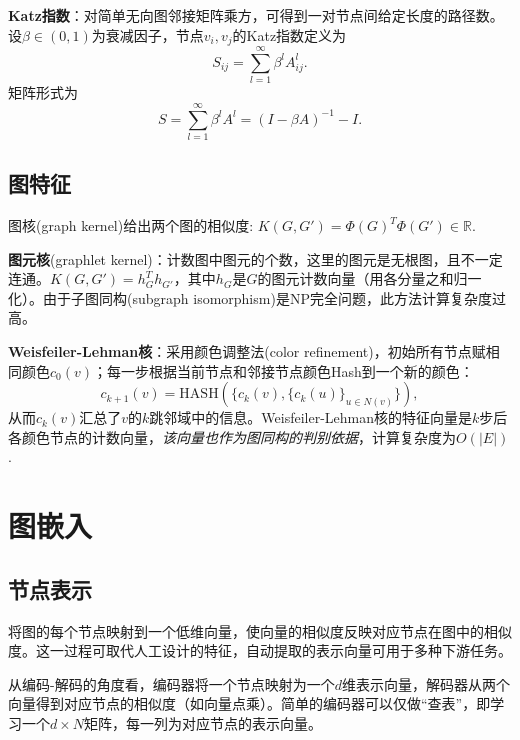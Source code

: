 \par \textbf{Katz指数}：对简单无向图邻接矩阵乘方，可得到一对节点间给定长度的路径数。设$\beta \in (0,1)$为衰减因子，节点$v_i,v_j$的Katz指数定义为
\begin{equation}
    S_{ij}=\sum_{l=1}^\infty \beta^l A^l_{ij}.
\end{equation}
矩阵形式为
\begin{equation}
    S=\sum_{l=1}^\infty \beta^l A^l=(I-\beta A)^{-1}-I.
\end{equation}

\subsection{图特征}
\par 图核(graph kernel)给出两个图的相似度: $K(G,G')=\Phi(G)^T \Phi(G')\in \mathbb{R}$.
\par \textbf{图元核}(graphlet kernel)：计数图中图元的个数，这里的图元是无根图，且不一定连通。$K(G,G')=h_G^T h_{G'}$，其中$h_G$是$G$的图元计数向量（用各分量之和归一化）。由于子图同构(subgraph isomorphism)是NP完全问题，此方法计算复杂度过高。

\par \textbf{Weisfeiler-Lehman核}：采用颜色调整法(color refinement)，初始所有节点赋相同颜色$c_0(v)$；每一步根据当前节点和邻接节点颜色Hash到一个新的颜色：
\begin{equation}
    c_{k+1}(v)=\text{HASH}(\{c_k(v),\{c_k(u)\}_{u\in N(v)}\}),
\end{equation}
从而$c_k(v)$汇总了$v$的$k$跳邻域中的信息。Weisfeiler-Lehman核的特征向量是$k$步后各颜色节点的计数向量，\emph{该向量也作为图同构的判别依据}，计算复杂度为$O(\vert E \vert)$.

\section{图嵌入}

\subsection{节点表示}
\par 将图的每个节点映射到一个低维向量，使向量的相似度反映对应节点在图中的相似度。这一过程可取代人工设计的特征，自动提取的表示向量可用于多种下游任务。

\par 从编码-解码的角度看，编码器将一个节点映射为一个$d$维表示向量，解码器从两个向量得到对应节点的相似度（如向量点乘）。简单的编码器可以仅做“查表”，即学习一个$d\times N$矩阵，每一列为对应节点的表示向量。

